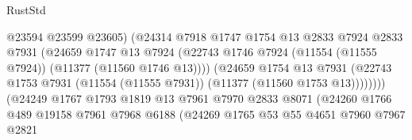 \begin{lexlean}{RustStd}
\begin{coremodule}
                                          @23594
                                          @23599
                                          @23605)
                                        (@24314
                                          @7918
                                          @1747
                                          @1754
                                          @13
                                          @2833
                                          @7924
                                          @2833
                                          @7931
                                          (@24659
                                            @1747
                                            @13
                                            @7924
                                            (@22743
                                              @1746
                                              @7924
                                              (@11554 (@11555 @7924))
                                              (@11377 (@11560 @1746 @13))))
                                          (@24659
                                            @1754
                                            @13
                                            @7931
                                            (@22743
                                              @1753
                                              @7931
                                              (@11554 (@11555 @7931))
                                              (@11377 (@11560 @1753 @13))))))))
                                  (@24249
                                    @1767
                                    @1793
                                    @1819
                                    @13
                                    @7961
                                    @7970
                                    @2833
                                    @8071
                                    (@24260
                                      @1766
                                      @489
                                      @19158
                                      @7961
                                      @7968
                                      @6188
                                      (@24269
                                        @1765
                                        @53
                                        @55
                                        @4651
                                        @7960
                                        @7967
                                        @2821

\end{coremodule}
\end{lexlean}

